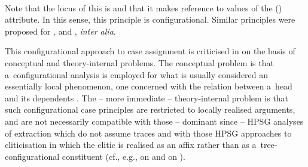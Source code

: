 \documentclass[output=paper,biblatex,babelshorthands,newtxmath,draftmode,colorlinks,citecolor=brown]{langscibook}
\begin{document}
\hfill
{}
\ex
{}
\impl\medskip\\
\hfill
{}
\z
Note that the locus of this  is  and that it makes reference to
 values of the  () attribute.  In this
sense, this principle is configurational.  Similar principles were proposed for 
\citep{Yoo93a-u,brat:96},  \citep{Grover95a-u} and  \citep{prze:95b},
\emph{inter alia}.

This configurational approach to case assignment is criticised in \citet{prze:96,Prze99b,Prze99} on
the basis of conceptual and theory-internal problems.  The conceptual problem is that
a~configurational analysis is employed for what is usually considered an essentially local
phenomenon, one concerned with the relation between a~head and its dependents \citep{blak:94}.  The
– more immediate – theory-internal problem is that such configurational case principles are
restricted to locally realised arguments, and are not necessarily compatible with those – dominant
since \citet[Chapter~9]{ps2} – HPSG analyses of extraction which do not assume traces and with those
HPSG approaches to cliticisation in which the clitic is realised as an affix rather than as
a~tree-configurational constituent (cf., e.g., \citealt{MS97a-u} on  and
\citealt{Monachesi99a-u} on ).
\end{document}
